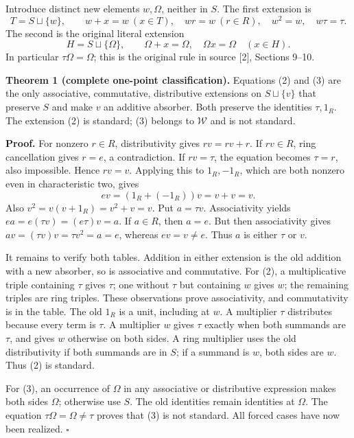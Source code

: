 \documentclass[
]{article}
\begin{document}
Introduce distinct new elements \(w,\Omega\), neither in \(S\). The
first extension is \[
T=S\sqcup\{w\},\qquad
w+x=w\ (x\in T),\quad wr=w\ (r\in R),\quad
w^2=w,\quad w\tau=\tau.
\tag{2}
\] The second is the original literal extension \[
H=S\sqcup\{\Omega\},\qquad
\Omega+x=\Omega,\quad \Omega x=\Omega\quad(x\in H).
\tag{3}
\] In particular \(\tau\Omega=\Omega\); this is the original rule in
source {[}2{]}, Sections 9--10.

\textbf{Theorem 1 (complete one-point classification).} Equations (2)
and (3) are the only associative, commutative, distributive extensions
on \(S\sqcup\{v\}\) that preserve \(S\) and make \(v\) an additive
absorber. Both preserve the identities \(\tau,1_R\). The extension (2)
is standard; (3) belongs to \(\mathcal W\) and is not standard.

\textbf{Proof.} For nonzero \(r\in R\), distributivity gives
\(rv=rv+r\). If \(rv\in R\), ring cancellation gives \(r=e\), a
contradiction. If \(rv=\tau\), the equation becomes \(\tau=r\), also
impossible. Hence \(rv=v\). Applying this to \(1_R,-1_R\), which are
both nonzero even in characteristic two, gives \[
ev=(1_R+(-1_R))v=v+v=v.
\] Also \(v^2=v(v+1_R)=v^2+v=v\). Put \(a=\tau v\). Associativity yields
\(ea=e(\tau v)=(e\tau)v=a\). If \(a\in R\), then \(a=e\). But then
associativity gives \(av=(\tau v)v=\tau v^2=a=e\), whereas
\(ev=v\ne e\). Thus \(a\) is either \(\tau\) or \(v\).

It remains to verify both tables. Addition in either extension is the
old addition with a new absorber, so is associative and commutative. For
(2), a multiplicative triple containing \(\tau\) gives \(\tau\); one
without \(\tau\) but containing \(w\) gives \(w\); the remaining triples
are ring triples. These observations prove associativity, and
commutativity is in the table. The old \(1_R\) is a unit, including at
\(w\). A multiplier \(\tau\) distributes because every term is \(\tau\).
A multiplier \(w\) gives \(\tau\) exactly when both summands are
\(\tau\), and gives \(w\) otherwise on both sides. A ring multiplier
uses the old distributivity if both summands are in \(S\); if a summand
is \(w\), both sides are \(w\). Thus (2) is standard.

For (3), an occurrence of \(\Omega\) in any associative or distributive
expression makes both sides \(\Omega\); otherwise use \(S\). The old
identities remain identities at \(\Omega\). The equation
\(\tau\Omega=\Omega\ne\tau\) proves that (3) is not standard. All forced
cases have now been realized. \(\square\)
\end{document}
